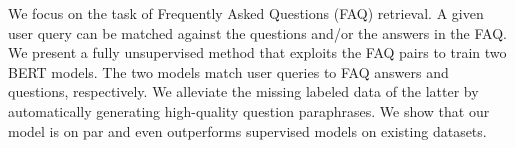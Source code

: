 We focus on the task of Frequently Asked Questions (FAQ) retrieval. A given user query can be matched against the questions and/or the answers in the FAQ. We present a fully unsupervised method that exploits the FAQ pairs to train two BERT models. The two models match user queries to FAQ answers and questions, respectively. We alleviate the missing labeled data of the latter by automatically generating high-quality question paraphrases. We show that our model is on par and even outperforms supervised models on existing datasets.
